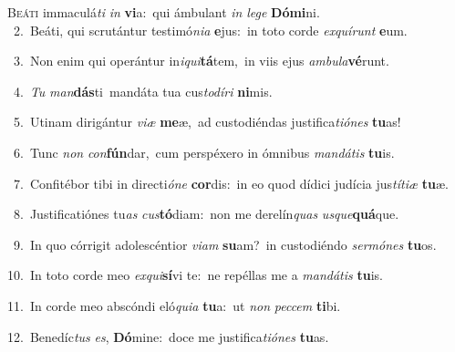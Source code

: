 \lettrine{\initial\textcolor{\initialcolor}{B}}{eáti} immaculá\textit{ti} \textit{in} \textbf{vi}\-a:~\star qui ámbulant \textit{in} \textit{le}\-\textit{ge} \textbf{Dó}\-\textbf{mi}ni.\\
{\numbfont\textcolor{\numbcolor}{~2.}}~Beáti, qui scrutántur testimó\-\textit{ni}\-\textit{a} \textbf{e}\-jus:~\star in toto corde \textit{ex}\-\textit{quí}\textit{runt} \textbf{e}\-um.\par
{\numbfont\textcolor{\numbcolor}{~3.}}~Non enim qui operántur in\-\textit{i}\-\textit{qui}\textbf{tá}tem,~\star in viis ejus \textit{am}\-\textit{bu}\textit{la}\textbf{vé}runt.\par
{\numbfont\textcolor{\numbcolor}{~4.}}~\textit{Tu} \textit{man}\-\textbf{dás}ti~\star mandáta tua cus\-\textit{to}\-\textit{dí}\textit{ri} \textbf{ni}\-mis.\par
{\numbfont\textcolor{\numbcolor}{~5.}}~Utinam dirigántur \textit{vi}\-\textit{æ} \textbf{me}\-æ,~\star ad custodiéndas justifica\-\textit{ti}\-\textit{ó}\textit{nes} \textbf{tu}\-as!\par
{\numbfont\textcolor{\numbcolor}{~6.}}~Tunc \textit{non} \textit{con}\-\textbf{fún}dar,~\star cum perspéxero in ómnibus \textit{man}\-\textit{dá}\textit{tis} \textbf{tu}\-is.\par
{\numbfont\textcolor{\numbcolor}{~7.}}~Confitébor tibi in directi\-\textit{ó}\-\textit{ne} \textbf{cor}\-dis:~\star in eo quod dídici judícia jus\-\textit{tí}\-\textit{ti}\textit{æ} \textbf{tu}\-æ.\par
{\numbfont\textcolor{\numbcolor}{~8.}}~Justificatiónes tu\textit{as} \textit{cus}\-\textbf{tó}diam:~\star non me derelín\textit{quas} \textit{us}\-\textit{que}\textbf{quá}que.\par
{\numbfont\textcolor{\numbcolor}{~9.}}~In quo córrigit adolescéntior \textit{vi}\-\textit{am} \textbf{su}\-am?~\star in custodiéndo \textit{ser}\-\textit{mó}\textit{nes} \textbf{tu}\-os.\par
{\numbfont\textcolor{\numbcolor}{10.}}~In toto corde meo \textit{ex}\-\textit{qui}\textbf{sí}vi te:~\star ne repéllas me a \textit{man}\-\textit{dá}\textit{tis} \textbf{tu}\-is.\par
{\numbfont\textcolor{\numbcolor}{11.}}~In corde meo abscóndi eló\-\textit{qui}\-\textit{a} \textbf{tu}\-a:~\star ut \textit{non} \textit{pec}\-\textit{cem} \textbf{ti}\-bi.\par
{\numbfont\textcolor{\numbcolor}{12.}}~Benedíc\textit{tus} \textit{es}\-, \textbf{Dó}\-mine:~\star doce me justifica\-\textit{ti}\-\textit{ó}\textit{nes} \textbf{tu}\-as.\par

